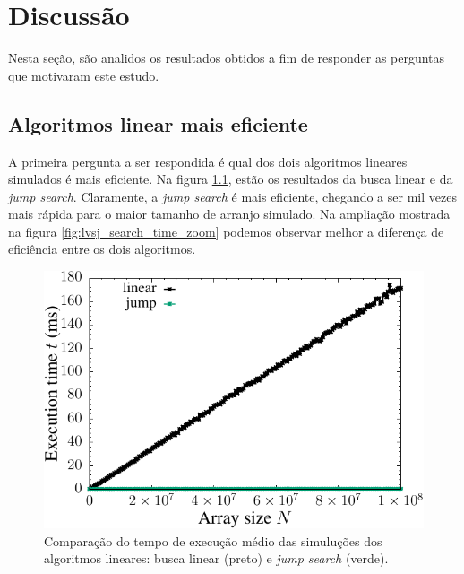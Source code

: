 \chapter{Discussão}

Nesta seção, são analidos os resultados obtidos a fim de responder as perguntas que motivaram este estudo.

\section{Algoritmos linear mais eficiente}

A primeira pergunta a ser respondida é qual dos dois algoritmos lineares simulados é mais eficiente. Na figura \ref{fig:lvsj_search_time}, estão os resultados da busca linear e da {\it jump search}. Claramente, a {\it jump search} é mais eficiente, chegando a ser mil vezes mais rápida para o maior tamanho de arranjo simulado. Na ampliação mostrada na figura \ref{fig:lvsj_search_time_zoom} podemos observar melhor a diferença de eficiência entre os dois algoritmos. 

\begin{figure}[H]
  \centering
  \includegraphics[scale=1.2]{../plots/lvsj_search_time.pdf}
  \caption{Comparação do tempo de execução médio das simuluções dos algoritmos lineares: busca linear (preto) e {\it jump search} (verde).}
  \label{fig:lvsj_search_time}
\end{figure} 

